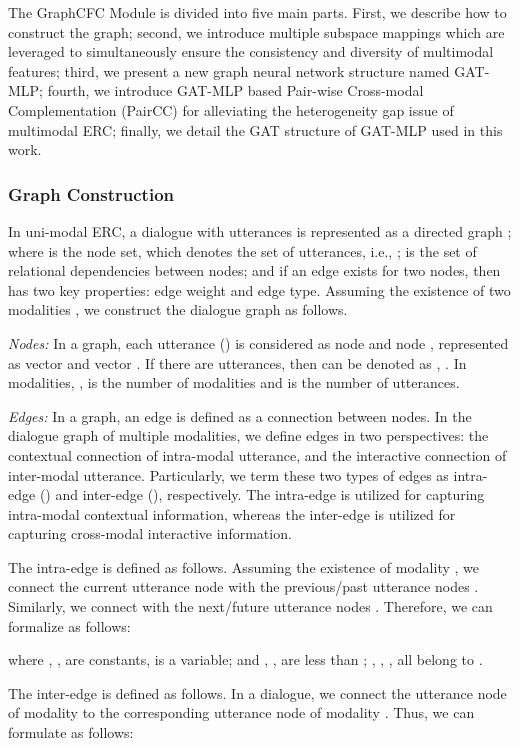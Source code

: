 \documentclass[lettersize,journal]{IEEEtran}
\begin{document}
The GraphCFC Module is divided into five main parts. First, we describe how to construct the graph; second, we introduce multiple subspace mappings which are leveraged to simultaneously ensure the consistency and diversity of multimodal features; third, we present a new graph neural network structure named GAT-MLP; fourth, we introduce GAT-MLP based Pair-wise Cross-modal Complementation (PairCC) for alleviating the heterogeneity gap issue of multimodal ERC; finally, we detail the GAT structure of GAT-MLP used in this work.

\subsubsection{Graph Construction}
In uni-modal ERC, a dialogue with  utterances is represented as a directed graph ; where  is the node set, which denotes the set of utterances, i.e., ;  is the set of relational dependencies between nodes; and if an edge exists for two nodes, then  has two key properties: edge weight and edge type. Assuming the existence of two modalities , we construct the dialogue graph as follows.

\textit{Nodes:} In a graph, each utterance  () is considered as node  and node , represented as vector  and vector . If there are  utterances, then  can be denoted as , . In  modalities, ,  is the number of modalities and  is the number of utterances.

\textit{Edges:} In a graph, an edge is defined as a connection between nodes. In the dialogue graph of multiple modalities, we define edges in two perspectives: the contextual connection of intra-modal utterance, and the interactive connection of inter-modal utterance. Particularly, we term these two types of edges as intra-edge () and inter-edge (), respectively. The intra-edge is utilized for capturing intra-modal contextual information, whereas the inter-edge is utilized for capturing cross-modal interactive information.

The intra-edge is defined as follows. Assuming the existence of modality ,  we connect the current utterance node  with the previous/past  utterance nodes . Similarly, we connect  with the next/future  utterance nodes . Therefore, we can formalize  as follows: 

where , ,  are constants,  is a variable; and , ,  are less than ; , , ,  all belong to .

The inter-edge is defined as follows. In a dialogue, we connect the utterance node  of modality  to the corresponding utterance node  of modality . Thus, we can formulate  as follows:
\end{document}
